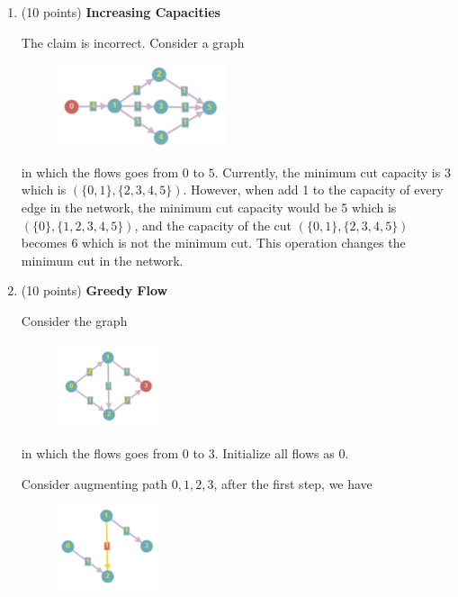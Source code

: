 \documentclass{article}
\begin{document}
\begin{enumerate}[topsep=0pt]

\item (10 points) \textbf{Increasing Capacities} 

The claim is incorrect. Consider a graph
\begin{figure}[H]
  \centering
  \includegraphics[width=5cm]{Q1.png}
\end{figure}

in which the flows goes from $0$ to $5$. Currently, the minimum cut capacity is 3 which is $(\{0,1\},\{2,3,4,5\})$.
However, when add 1 to the capacity of every edge in the network,
the minimum cut capacity would be 5 which is $(\{0\},\{1,2,3,4,5\})$, 
and the capacity of the cut $(\{0,1\},\{2,3,4,5\})$ becomes 6 which is not the minimum cut.
This operation changes the minimum cut in the network.



\item (10 points) \textbf{Greedy Flow} 

Consider the graph

\begin{figure}[H]
  \centering
  \includegraphics[width=3cm]{Q2.1.png}
\end{figure}

in which the flows goes from $0$ to $3$.
Initialize all flows as 0.

Consider augmenting path $0,1,2,3$, after the first step, we have

\begin{figure}[H]
  \centering
  \includegraphics[width=3cm]{Q2.2.png}
\end{figure}


\end{enumerate}
\end{document}
